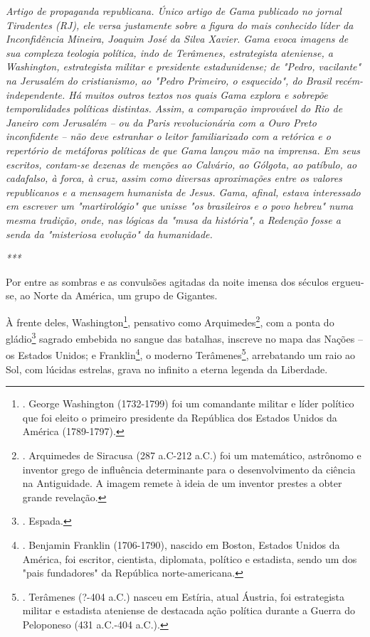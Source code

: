 \emph{Artigo de propaganda republicana. Único artigo de Gama publicado
no jornal Tiradentes (RJ), ele versa justamente sobre a figura do mais
conhecido líder da Inconfidência Mineira, Joaquim José da Silva Xavier.
Gama evoca imagens de sua complexa teologia política, indo de Terâmenes,
estrategista ateniense, a Washington, estrategista militar e presidente
estadunidense; de "Pedro, vacilante" na Jerusalém do cristianismo, ao
"Pedro Primeiro, o esquecido", do Brasil recém-independente. Há muitos
outros textos nos quais Gama explora e sobrepõe temporalidades políticas
distintas. Assim, a comparação improvável do Rio de Janeiro com
Jerusalém -- ou da Paris revolucionária com a Ouro Preto inconfidente --
não deve estranhar o leitor familiarizado com a retórica e o repertório
de metáforas políticas de que Gama lançou mão na imprensa. Em seus
escritos, contam-se dezenas de menções ao Calvário, ao Gólgota, ao
patíbulo, ao cadafalso, à forca, à cruz, assim como diversas
aproximações entre os valores republicanos e a mensagem humanista de
Jesus. Gama, afinal, estava interessado em escrever um "martirológio"
que unisse "os brasileiros e o povo hebreu" numa mesma tradição, onde,
nas lógicas da "musa da história", a Redenção fosse a senda da
"misteriosa evolução" da humanidade. }

\emph{***}

Por entre as sombras e as convulsões agitadas da noite imensa dos
séculos ergueu-se, ao Norte da América, um grupo de Gigantes.

À frente deles, Washington\footnote{. George Washington (1732-1799) foi
  um comandante militar e líder político que foi eleito o primeiro
  presidente da República dos Estados Unidos da América (1789-1797).},
pensativo como Arquimedes\footnote{. Arquimedes de Siracusa (287 a.C-212
  a.C.) foi um matemático, astrônomo e inventor grego de influência
  determinante para o desenvolvimento da ciência na Antiguidade. A
  imagem remete à ideia de um inventor prestes a obter grande revelação.},
com a ponta do gládio\footnote{. Espada.} sagrado embebida no sangue das
batalhas, inscreve no mapa das Nações -- os Estados Unidos; e
Franklin\footnote{. Benjamin Franklin (1706-1790), nascido em Boston,
  Estados Unidos da América, foi escritor, cientista, diplomata,
  político e estadista, sendo um dos "pais fundadores" da República
  norte-americana.}, o moderno Terâmenes\footnote{. Terâmenes (?-404
  a.C.) nasceu em Estíria, atual Áustria, foi estrategista militar e
  estadista ateniense de destacada ação política durante a Guerra do
  Peloponeso (431 a.C.-404 a.C.).}, arrebatando um raio ao Sol, com
lúcidas estrelas, grava no infinito a eterna legenda da Liberdade.

